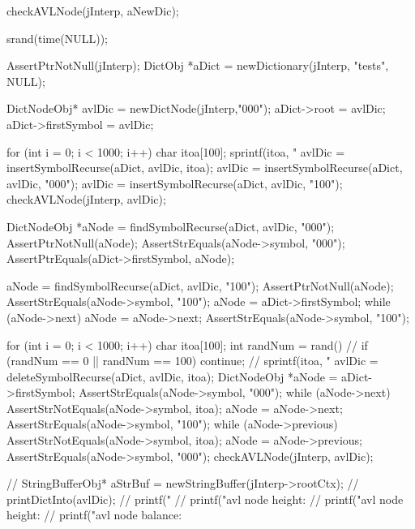   checkAVLNode(jInterp, aNewDic);
\stopCTest
\stopTestCase

\startCTest

  srand(time(NULL));

  AssertPtrNotNull(jInterp);
  DictObj *aDict = newDictionary(jInterp, "tests", NULL);

  DictNodeObj* avlDic = newDictNode(jInterp,"000");
  aDict->root         = avlDic;
  aDict->firstSymbol  = avlDic;

  for (int i = 0; i < 1000; i++) {
    char itoa[100];
    sprintf(itoa, "%
    avlDic = insertSymbolRecurse(aDict, avlDic, itoa);
  }
  avlDic = insertSymbolRecurse(aDict, avlDic, "000");
  avlDic = insertSymbolRecurse(aDict, avlDic, "100");
  checkAVLNode(jInterp, avlDic);

  DictNodeObj *aNode = findSymbolRecurse(aDict, avlDic, "000");
  AssertPtrNotNull(aNode);
  AssertStrEquals(aNode->symbol, "000");
  AssertPtrEquals(aDict->firstSymbol, aNode);
  
  aNode = findSymbolRecurse(aDict, avlDic, "100");
  AssertPtrNotNull(aNode);
  AssertStrEquals(aNode->symbol, "100");
  aNode = aDict->firstSymbol;
  while (aNode->next) aNode = aNode->next;
  AssertStrEquals(aNode->symbol, "100");
  
  for (int i = 0; i < 1000; i++) {
    char itoa[100];
    int randNum = rand() %
    //
    if (randNum == 0 || randNum == 100) continue;
    //
    sprintf(itoa, "%
    avlDic = deleteSymbolRecurse(aDict, avlDic, itoa);
    DictNodeObj *aNode = aDict->firstSymbol;
    AssertStrEquals(aNode->symbol, "000");
    while (aNode->next) {
      AssertStrNotEquals(aNode->symbol, itoa);
      aNode = aNode->next;
    }
    AssertStrEquals(aNode->symbol, "100");   
    while (aNode->previous) {
      AssertStrNotEquals(aNode->symbol, itoa);
      aNode = aNode->previous;
    }
    AssertStrEquals(aNode->symbol, "000");
    checkAVLNode(jInterp, avlDic);
  }
  
//  StringBufferObj* aStrBuf = newStringBuffer(jInterp->rootCtx);
//  printDictInto(avlDic);
//  printf("%
//  printf("avl node height: %
//  printf("avl node height: %
//  printf("avl node balance: %
\stopCTest
\stopTestCase
\stopTestSuite
